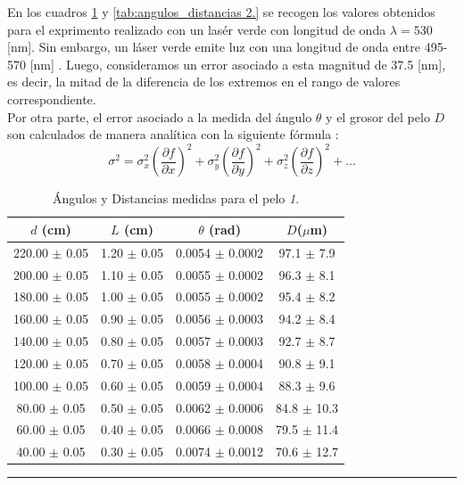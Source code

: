 \documentclass[10pt,a4paper]{article}
\begin{document}
\begin{multicols}{2}
		En los cuadros \ref{tab:angulos_distancias.} y \ref{tab:angulos_distancias 2.} se recogen los valores obtenidos para el exprimento realizado con un lasér verde con longitud de onda $\lambda = 530$[nm]. Sin embargo, un láser verde emite luz con una longitud de onda entre 495-570 [nm] \cite{colors}. Luego, consideramos un error asociado a esta magnitud de 37.5 [nm], es decir, la mitad de la diferencia de los extremos en el rango de valores correspondiente.\\
		
		Por otra parte, el error asociado a la medida del ángulo $\theta$ y el grosor del pelo $D$ son calculados de manera analítica con la siguiente fórmula \cite{error}:
		\begin{equation}\label{errores}
		\sigma^2 = \sigma^2_x \left( \frac{\partial f}{\partial x} \right)^2 + \sigma^2_y \left( \frac{\partial f}{\partial y} \right)^2 + \sigma^2_z \left( \frac{\partial f}{\partial z} \right)^2+...
		\end{equation}
	
		
		
	\end{multicols}
	
	\begin{table}[H]
		\centering
		\begin{tabular}{|c|c|c|c|}
			\hline
			$d$ (cm) & $L$ (cm) & $\theta$ (rad) &  $D$($\mu$m) \\ \hline
			220.00 $\pm$ 0.05  & 1.20 $\pm$ 0.05 &  0.0054 $\pm$ 0.0002  & 97.1 $\pm$ 7.9 \\
			200.00 $\pm$ 0.05  & 1.10 $\pm$ 0.05 &  0.0055 $\pm$ 0.0002  & 96.3 $\pm$ 8.1 \\
			180.00 $\pm$ 0.05  & 1.00 $\pm$ 0.05 &  0.0055 $\pm$ 0.0002 & 95.4 $\pm$ 8.2\\
			160.00 $\pm$ 0.05  & 0.90 $\pm$ 0.05 &  0.0056 $\pm$ 0.0003 & 94.2 $\pm$ 8.4 \\ 
			140.00 $\pm$ 0.05 & 0.80 $\pm$ 0.05 & 0.0057 $\pm$ 0.0003 & 92.7 $\pm$ 8.7\\ 
			120.00 $\pm$ 0.05 & 0.70 $\pm$ 0.05 & 0.0058 $\pm$ 0.0004 &  90.8 $\pm$ 9.1\\ 
			100.00 $\pm$ 0.05 & 0.60 $\pm$ 0.05 & 0.0059 $\pm$ 0.0004 & 88.3 $\pm$ 9.6\\
			80.00 $\pm$ 0.05  & 0.50 $\pm$ 0.05 &  0.0062 $\pm$ 0.0006 & 84.8 $\pm$ 10.3 \\ 
			60.00 $\pm$ 0.05 & 0.40 $\pm$ 0.05 &  0.0066 $\pm$ 0.0008 & 79.5 $\pm$ 11.4 \\
			40.00 $\pm$ 0.05 & 0.30 $\pm$ 0.05 &  0.0074 $\pm$ 0.0012 & 70.6 $\pm$ 12.7  \\ \hline
			
		\end{tabular}
		\caption{Ángulos y Distancias medidas para el pelo \textit{1}.}
		\label{tab:angulos_distancias.}
		\rule{100mm}{0.1mm}
	\end{table}
	
\end{document}
